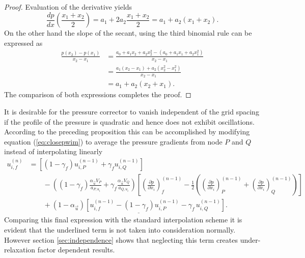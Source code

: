 \begin{proof}
  Evaluation of the derivative yields
  \begin{displaymath}
      \frac{dp}{dx}\left(\frac{x_1+x_2}{2}\right) = a_1 + 2 a_2 \frac{x_1 + x_2}{2} = a_1 + a_2(x_1 + x_2).
  \end{displaymath}
  On the other hand the slope of the secant, using the third binomial rule can be expressed as
  \begin{displaymath}
    \begin{array}{ll}
    \frac{p(x_2) - p(x_1)}{x_2 - x_1} 
  &= \frac{a_0 + a_1 x_2 + a_2 x_2^2 - \left(a_0 + a_1 x_1 + a_2 x_1 ^2\right)}{x_2 - x_1} \\[1.0em]
    \quad &= \frac{a_1 (x_2 - x_1) + a_2 \left(x_2^2 - x_1^2\right)}{x_2 - x_1} \\[1.0em]
    \quad &= a_1 + a_2 (x_2 + x_1).
  \end{array}
  \end{displaymath}
  The comparison of both expressions completes the proof.
\end{proof}
  It is desirable for the pressure corrector to vanish independent of the grid spacing if the profile of the pressure is quadratic and hence does not exhibit oscillations. According to the preceding proposition this can be accomplished by modifying equation (\ref{eq:closepwim}) to average the pressure gradients from node \(P\) and \(Q\) instead of interpolating linearly
  \begin{align}
    u_{i,f}^{(n)} 
    &=
    \left[\left(1 - \gamma_f\right) u_{i,P}^{(n-1)} + \gamma_f u_{i,Q}^{(n-1)} \right] \nonumber\\[1em]
    &\quad\quad - 
    \left(\left(1 - \gamma_f\right) \frac{\alpha_\vec{u} V_P}{a_{P,u_i}} + \gamma_f \frac{\alpha_\vec{u} V_Q}{a_{Q,u_i}}\right)
    \left[ 
    \left(\frac{\partial p}{\partial x_i}\right)_f^{(n-1)} 
    - \frac{1}{2} \left( \left( \frac{\partial p}{\partial x_i} \right)_P^{(n-1)} 
    + \left(\frac{\partial p}{\partial x_i}\right)_Q^{(n-1)} \right)
    \right] \nonumber \\[1em]
    &\quad\quad + \underline{\left(1 - \alpha_\vec{u}\right) \left[ u_{i,f}^{(n-1)} - \left(1 - \gamma_f\right) u_{i,P}^{(n-1)} - \gamma_f \, u_{i,Q}^{(n-1)} \right]}.
  \end{align}
  Comparing this final expression with the standard interpolation scheme it is evident that the underlined term is not taken into consideration \cite{ferziger02} normally. However section \ref{sec:independence} shows that neglecting this term creates under-relaxation factor dependent results.

